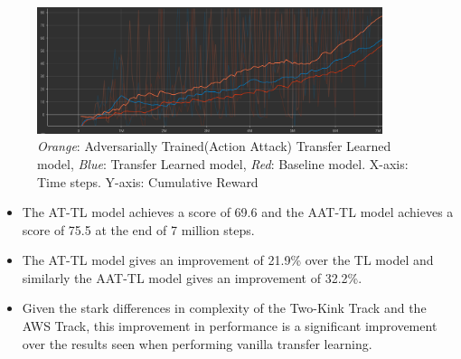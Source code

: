 
\begin{figure}[H]
  \centering
  \includegraphics[width=0.9\textwidth]{images/graphs/AAT2-TL-TwoKink-AWS.png}
  \caption{\textit{Orange}: Adversarially Trained(Action Attack)
    Transfer Learned model, \textit{Blue}: Transfer Learned model,
    \textit{Red}: Baseline model. X-axis: Time steps. Y-axis:
    Cumulative Reward }
  \label{fig:my_label}
\end{figure}

\begin{itemize}
\item The AT-TL model achieves a score of 69.6 and the AAT-TL model
  achieves a score of 75.5 at the end of 7 million steps.
\item The AT-TL model gives an improvement of 21.9\% over the TL model
  and similarly the AAT-TL model gives an improvement of 32.2\%.
\item Given the stark differences in complexity of the Two-Kink Track
  and the AWS Track, this improvement in performance is a significant
  improvement over the results seen when performing vanilla transfer
  learning.
\end{itemize}


